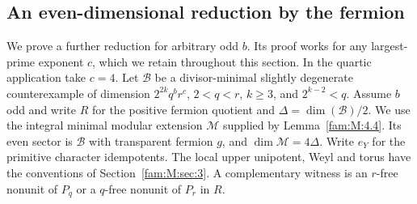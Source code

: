 \documentclass[11pt,a4paper]{article}
\numberwithin{equation}{section}
\theoremstyle{remark}
\begin{document}
\subsection{An even-dimensional reduction by the fermion}\label{fam:Q:sec:7}\label{fam:Q:n:sec:reduced}
We prove a further reduction for arbitrary odd $b$. Its proof
works for any largest-prime exponent $c$, which we retain throughout
this section. In the quartic application take $c=4$. Let $\mathcal B$ be a divisor-minimal slightly degenerate counterexample of
dimension $2^{2k}q^b r^c$, $2<q<r$, $k\ge3$, and $2^{k-2}<q$.
Assume $b$ odd and write $R$ for the positive fermion quotient and
$\Delta=\dim(\mathcal B)/2$. We use the integral minimal modular extension
$\mathcal M$ supplied by Lemma~\ref{fam:M:4.4}.
Its even sector is $\mathcal B$ with transparent fermion $g$, and $\dim\mathcal M=4\Delta$.
Write $e_Y$ for the primitive character idempotents. The local
upper unipotent, Weyl and torus have the conventions of
Section~\ref{fam:M:sec:3}. A complementary witness is an
$r$-free nonunit of $P_q$ or a $q$-free nonunit of $P_r$ in $R$.
\end{document}
